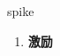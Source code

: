 
\begin{frame}
{\huge spike}
\begin{center}
\begin{enumerate}\Large
  \item \textbf{激励}
\end{enumerate}
\end{center}
\end{frame}
